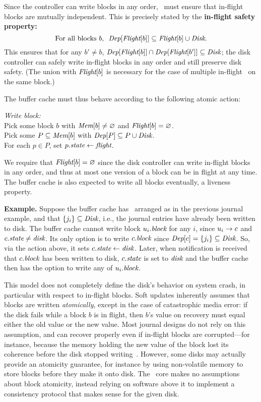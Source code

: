 \noindent
%
Since the controller can write blocks in any order, \Kudos\ must ensure
that in-flight blocks are mutually independent.  This is precisely stated
by the \textbf{in-flight safety property:}
%
\[ \text{For all blocks $b$,~~} \PDepset{\PInf[b]} \subseteq \PInf[b] \cup \PDisk . \]
%
This ensures that for any $b' \neq b$, $\PDepset{\PInf[b]} \cap
 \PDepset{\PInf[b']} \subseteq \PDisk$; the disk controller can safely
 write in-flight blocks in any order and still preserve disk safety.
%
(The union with $\PInf[b]$ is necessary for the case of multiple in-flight
\patches\ on the same block.)


The buffer cache must thus behave according to the following atomic action:

\begin{tabbing}
\textit{Write block:} \\
\quad Pick some block $b$ with $\PMem[b] \neq \emptyset$ and $\PInf[b] =
\emptyset$. \\
\quad Pick some $P \subseteq \PMem[b]$ with $\PDepset{P} \subseteq P \cup
\PDisk$. \\
\quad For each $p \in P$, set $p.\textit{state} \gets \textit{flight}$.
\end{tabbing}

\noindent
%
We require that $\PInf[b] = \emptyset$ since the disk controller can write
in-flight blocks in any order, and thus at most one version of a block can
be in flight at any time.
%
The buffer cache is also expected to write all blocks eventually, a
 liveness property.

\textbf{Example.}
%
Suppose the buffer cache has \patches\ arranged as in the previous journal
example, and that $\{j_i\} \subseteq \PDisk$, i.e., the journal entries have
already been written to disk.
%
The buffer cache cannot write block $u_i.\textit{block}$ for any $i$, since $u_i
\rightarrow c$ and $c.\textit{state} \neq \textit{disk}$.
%
Its only option is to write $c.\textit{block}$ since $\PDepset{c} = \{j_i\}
\subseteq \PDisk$.
%
So, via the action above, it sets $c.\textit{state} \gets \textit{disk}$.
%
Later, when notification is received that $c.\textit{block}$ has been written to disk,
$c.\textit{state}$ is set to $\textit{disk}$ and the buffer cache then has the option to
write any of $u_i.\textit{block}$.

This model does not completely define the disk's behavior on system crash,
 in particular with respect to in-flight blocks.
%
Soft updates inherently assumes that blocks are written
\emph{atomically}, except in the case of catastrophic media error:
%
if the disk fails while a block $b$ is in flight, then $b$'s
value on recovery must equal either the old value or the new value.
%
Most journal designs do not rely on this assumption, and can recover
 properly even if in-flight blocks are corrupted---for instance,
 because the memory holding the new value of the block lost its coherence
 before the disk stopped writing~\cite{nightingale06rethink}.
%
However, some disks may actually provide an atomicity guarantee, for
 instance by using non-volatile memory to store blocks before they make it
 onto disk.
%
The \Kudos\ core makes no assumptions about block atomicity, instead relying
 on software above it to implement a consistency protocol that makes sense
 for the given disk.


